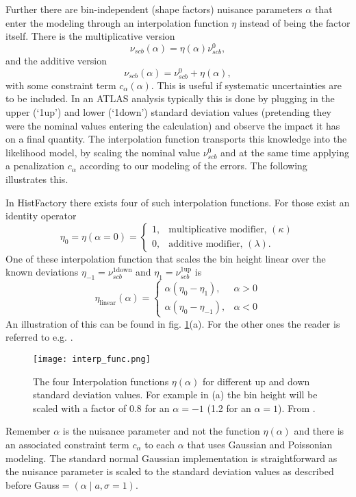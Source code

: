 Further there are bin-independent (shape factors) nuisance parameters $\alpha$ that enter the modeling through an interpolation function $\eta$ instead of being the factor itself. There is the multiplicative version 
\begin{equation}
    \nu_{scb}(\alpha)=\eta(\alpha) \nu_{scb}^0,
\end{equation}
and the additive version
\begin{equation}
    \nu_{scb}(\alpha)=\nu_{scb}^0 + \eta(\alpha), 
\end{equation}
with some constraint term $c_\alpha(\alpha)$. This is useful if systematic uncertainties are to be included. In an ATLAS analysis typically this is done by plugging in the upper (`1up') and lower (`1down') standard deviation values (pretending they were the nominal values entering the calculation) and observe the impact it has on a final quantity. The interpolation function transports this knowledge into the likelihood model, by scaling the nominal value $\nu_{scb}^0$ and at the same time applying a penalization $c_\alpha$ according to our modeling of the errors. The following illustrates this.

In HistFactory there exists four of such interpolation functions. For those exist an identity operator 
\begin{equation}
    \eta_0=\eta (\alpha=0) =
    \begin{cases}
        1 ,& \text{multiplicative modifier, } (\kappa) \\
        0 ,& \text{additive modifier, } (\lambda).
    \end{cases}
\end{equation}
One of these interpolation function that scales the bin height linear over the known deviations $\eta_{-1}=\nu_{scb}^\mathrm{1down}$ and $\eta_{1}=\nu_{scb}^\mathrm{1up}$ is
\begin{equation}
    \eta_\mathrm{linear}(\alpha)=
    \begin{cases}
        \alpha(\eta_0 - \eta_1) ,& \alpha>0\\
        \alpha(\eta_0 - \eta_{-1}) ,& \alpha<0
    \end{cases}
\end{equation}
An illustration of this can be found in fig. \ref{fig:interp_func}(a). For the other ones the reader is referred to e.g. \citep{heinrich2019searches}. 
\begin{figure}
    \centering
    \texttt{[image: interp\_func.png]}
        \caption[]{The four Interpolation functions $\eta(\alpha)$ for different up and down standard deviation values. For example in (a) the bin height will be scaled with a factor of 0.8 for an $\alpha=-1$ (1.2 for an $\alpha=1$). From \citep{cranmer2012histfactory}.}
    \label{fig:interp_func}    
\end{figure}
Remember $\alpha$ is the nuisance parameter and not the function $\eta(\alpha)$ and there is an associated constraint term $c_\alpha$ to each $\alpha$ that uses Gaussian and Poissonian modeling. The standard normal Gaussian  implementation is straightforward as the nuisance parameter is scaled to the standard deviation values as described before Gauss$=(\alpha \mid a, \sigma=1)$. 

